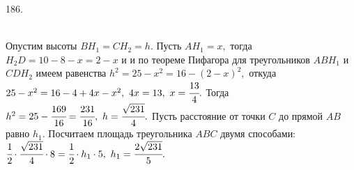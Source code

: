 186. \begin{figure}[ht!]
\end{figure}\\
Опустим высоты $BH_1=CH_2=h.$ Пусть $AH_1=x,$ тогда $H_2D=10-8-x=2-x$ и и по теореме Пифагора для треугольников $ABH_1$ и $CDH_2$ имеем равенства $h^2=25-x^2=16-(2-x)^2,$ откуда $25-x^2=16-4+4x-x^2,\ 4x=13,\ x=\cfrac{13}{4}.$ Тогда $h^2=25-\cfrac{169}{16}=\cfrac{231}{16},\ h=\cfrac{\sqrt{231}}{4}.$ Пусть расстояние от точки $C$ до прямой $AB$ равно $h_1.$ Посчитаем площадь треугольника $ABC$ двумя способами: $\cfrac{1}{2}\cdot\cfrac{\sqrt{231}}{4}\cdot8=
\cfrac{1}{2}\cdot h_1\cdot5,\ h_1=\cfrac{2\sqrt{231}}{5}.$\\
